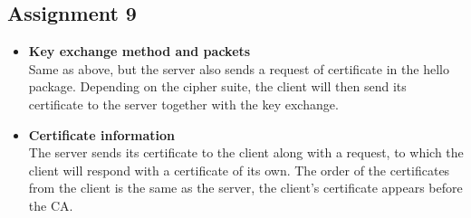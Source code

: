 \documentclass[11pt,a4paper]{article}
\begin{document}
\subsection{Assignment 9}
\begin{itemize}
\item \textbf{Key exchange method and packets}\\ 
Same as above, but the server also sends a request of certificate in the hello package. Depending on the cipher suite, the client will then send its certificate to the server together with the key exchange.
\item \textbf{Certificate information}\\
The server sends its certificate to the client along with a request, to which the client will respond with a certificate of its own.
The order of the certificates from the client is the same as the server, the client's certificate appears before the CA.  
\end{itemize}
\end{document}

